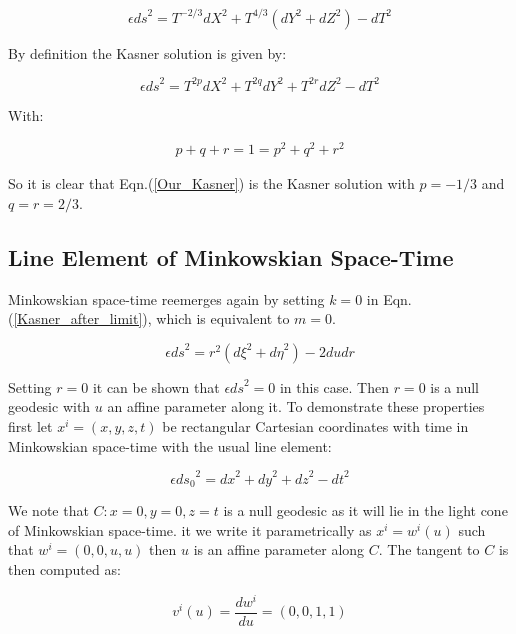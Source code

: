 \begin{equation}\label{Our_Kasner} 
\epsilon {ds}^2 = T^{-2/3} {dX}^2 + T^{4/3} \left( dY^2 + dZ^2 \right) - dT^2
\end{equation}

\noindent By definition the Kasner solution is given by:

\begin{equation*} 
\epsilon {ds}^2 = T^{2p} {dX}^2 + T^{2q} dY^2 + T^{2r} dZ^2 - dT^2
\end{equation*}

\noindent With:

\begin{eqnarray*}
p + q + r = 1 = p^2 + q^2 + r^2
\end{eqnarray*}

\noindent So it is clear that Eqn.(\ref{Our_Kasner}) is the Kasner solution with $p = -1/3$ and $q = r = 2/3$.

\subsection{Line Element of Minkowskian Space-Time}

Minkowskian space-time reemerges again by setting $k = 0$ in Eqn.(\ref{Kasner_after_limit}), which is equivalent to $m = 0$. 

\begin{equation}\label{Kasner_after_limit_no_k}
\epsilon {ds}^2 = r^2 ({d\xi}^2 + {d\eta}^2) - 2 {du}{dr}
\end{equation}

Setting $r = 0$ it can be shown that $\epsilon {ds}^2 = 0$ in this case. Then $r = 0$ is a null geodesic with $u$ an affine parameter along it. To demonstrate these properties first let $x^i = (x,y,z,t)$ be rectangular Cartesian coordinates with time in Minkowskian space-time with the usual line element:

\begin{equation*} 
\epsilon {ds_0}^2 = {dx}^2 + {dy}^2 + {dz}^2 - {dt}^2
\end{equation*} 

\noindent We note that $C: x = 0, y = 0, z = t$ is a null geodesic as it will lie in the light cone of Minkowskian space-time. it we write it parametrically as $x^i = w^i (u)$ such that $w^i = (0,0,u,u)$ then $u$ is an affine parameter along $C$. The tangent to $C$ is then computed as:

\begin{equation*} 
v^i (u) = \frac{d w^i}{du} = (0,0,1,1)
\end{equation*} 
   
